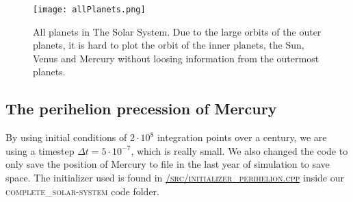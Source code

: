 \documentclass[../main.tex]{subfiles}
\begin{document}
\begin{figure}[!h]
\centering
  \texttt{[image: allPlanets.png]}
  \caption{All planets in The Solar System. Due to the large orbits of the outer planets, it is hard to plot the orbit of the inner planets, the Sun, Venus and Mercury without loosing information from the outermost planets.}
  \label{fig:allPlanets}
\end{figure}


\subsection{The perihelion precession of Mercury}
By using initial conditions of $2 \cdot 10^8$ integration points over a century, we are using a timestep $\Delta t = 5\cdot 10^{-7}$, which is really small. We also changed the code to only save the position of Mercury to file in the last year of simulation to save space. The initializer used is found in \href{https://github.com/kmaasrud/Project-5/blob/master/code/complete_solar-system/src/initialize_perihelion.cpp}{\textsc{/src/initializer\_perihelion.cpp}} inside our \textsc{complete\_solar-system} code folder.

\begin{table}[!h]
  \centering
  \caption{Table of Mercury's calculated perihelion precession with and without relativistic correction.}
\end{table}
\FloatBarrier
\end{document}
